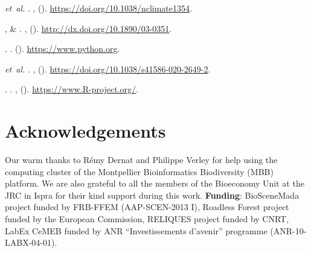\documentclass[
  12pt,
]{article}
\begin{document}
\begin{thebibliography}{99}
 \emph{et~al.}
\newblock {}.
\newblock \emph{}
  \textbf{}, 
  ().
\newblock \urlprefix\url{https://doi.org/10.1038/nclimate1354}.

,  \&
\newblock {}.
\newblock \emph{} \textbf{},
   ().
\newblock \urlprefix\url{http://dx.doi.org/10.1890/03-0351}.

.
\newblock \emph{}.
\newblock {}
  ().
\newblock \urlprefix\url{https://www.python.org}.

 \emph{et~al.}
\newblock {}.
\newblock \emph{} \textbf{},
   ().
\newblock \urlprefix\url{https://doi.org/10.1038/s41586-020-2649-2}.

.
\newblock \emph{}.
\newblock {},
   ().
\newblock \urlprefix\url{https://www.R-project.org/}.

\end{thebibliography}


\hypertarget{acknowledgements}{%
\section{Acknowledgements}\label{acknowledgements}}

Our warm thanks to Rémy Dernat and Philippe Verley for help using the computing cluster of the Montpellier Bioinformatics Biodiversity (MBB) platform. We are also grateful to all the members of the Bioeconomy Unit at the JRC in Ispra for their kind support during this work. \textbf{Funding}: BioSceneMada project funded by FRB-FFEM (AAP-SCEN-2013 I), Roadless Forest project funded by the European Commission, RELIQUES project funded by CNRT, LabEx CeMEB funded by ANR ``Investissements d'avenir'' programme (ANR-10-LABX-04-01).
\end{document}
